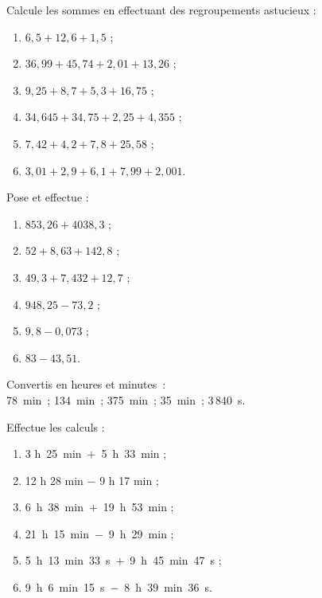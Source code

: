 \begin{exercice}
Calcule les sommes en effectuant des regroupements astucieux :
\begin{enumerate} 
 \item $6,5 + 12,6 + 1,5$ ;
 \item $36,99 + 45,74 + 2,01 + 13,26$ ;
 \item $9,25 + 8,7 + 5,3 + 16,75$ ;
 \item $34,645 + 34,75 + 2,25 + 4,355$ ;
 \item $7,42 + 4,2 + 7,8 + 25,58$ ;
 \item $3,01 + 2,9 + 6,1 + 7,99 + 2,001$.
 \end{enumerate}
\end{exercice}


\begin{exercice}
Pose et effectue :
\begin{enumerate} 
 \item $853,26 + 4 038,3$ ;
 \item $52 + 8,63 + 142,8$ ;
 \item $49,3 + 7,432 + 12,7$ ;
 \item $948,25 - 73,2$ ;
 \item $9,8 - 0,073$ ;
 \item $83 - 43,51$.
 \end{enumerate} 
 \end{exercice}


\begin{exercice}
Convertis en heures et minutes :\\
78 min ; 134 min ; 375 min ; 35 min ; 3\,840 s.
\end{exercice}


\begin{exercice}
Effectue les calculs :
\begin{enumerate} 
 \item 3 h 25 min $+$ 5 h 33 min ;
 \item 12 h 28 min $-$ 9 h 17 min ;
 \item 6 h 38 min $+$ 19 h 53 min ;
 \item 21 h 15 min $-$ 9 h 29 min ;
 \item 5 h 13 min 33 s $+$ 9 h 45 min 47 s ;
 \item 9 h 6 min 15 s $-$ 8 h 39 min 36 s.
 \end{enumerate}
\end{exercice}


